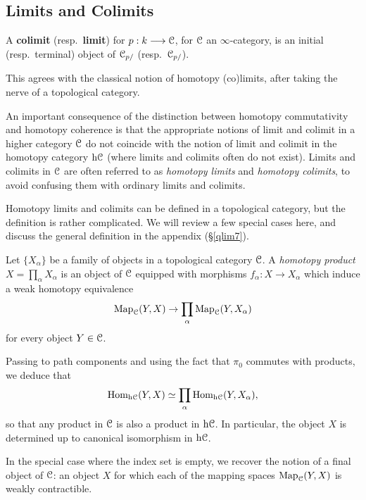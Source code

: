 \subsection{Limits and Colimits}\label{limitcolimit}
\begin{1.2.13 Limits and colimits}
\begin{shaded}
A \textbf{colimit} (resp.\ \textbf{limit})  for $p:k\longrightarrow\mathcal{C}$, for $\mathcal{C}$ an $\infty$-category, is an initial (resp.\ terminal)  object of $\operatorname{\mathcal{C}}_{p/}$ (resp.\ $\operatorname{\mathcal{C}}_{p/}$).

This agrees with the classical notion of homotopy (co)limits, after taking the nerve of a topological category.
\end{shaded}
An important consequence of the distinction between homotopy
commutativity and homotopy coherence is that the appropriate
notions of limit and colimit in a higher category
$\operatorname{\mathcal{C}}$ do not coincide with the notion of limit and colimit in the homotopy category $\rm{h} \it{\operatorname{\mathcal{C}}}$ (where limits and colimits often do
not exist). Limits and colimits in
$\operatorname{\mathcal{C}}$ are often referred to as {\it homotopy limits} and
{\it homotopy colimits}, to avoid confusing them with ordinary limits
and colimits.

Homotopy limits and
colimits can be defined in a topological category, but the
definition is rather complicated. We will review a few special cases here, and discuss the general definition in the appendix (\S \ref{qlim7}).

\begin{example}\label{examprod}
Let $\{ X_{\alpha} \}$ be a family of objects in a topological
category $\operatorname{\mathcal{C}}$. A {\it homotopy product} $X = \prod_{\alpha}
X_{\alpha}$ is an object of $\operatorname{\mathcal{C}}$ equipped with morphisms
$f_{\alpha}: X \rightarrow X_{\alpha}$ which induce a weak
homotopy equivalence
$$ \operatorname{{Map}}_{\operatorname{\mathcal{C}}}(Y,X) \rightarrow \prod_{\alpha} \operatorname{{Map}}_{\operatorname{\mathcal{C}}}(Y,
X_{\alpha})$$ for every object $Y \in \operatorname{\mathcal{C}}$.

Passing to path components and using the fact that $\pi_0$
commutes with products, we deduce that $$\operatorname{Hom}_{\rm{h} \it{\operatorname{\mathcal{C}}}}(Y,X) \simeq
\prod_{\alpha} \operatorname{Hom}_{\rm{h} \it{\operatorname{\mathcal{C}}}}(Y, X_{\alpha}),$$ so that any product in $\operatorname{\mathcal{C}}$ is
also a product in $\rm{h} \it{\operatorname{\mathcal{C}}}$. In particular, the object $X$ is
determined up to canonical isomorphism in $\rm{h} \it{\operatorname{\mathcal{C}}}$.

In the special case where the index set is empty, we recover the
notion of a final object of $\operatorname{\mathcal{C}}$: an object $X$ for which each
of the mapping spaces $\operatorname{{Map}}_{\operatorname{\mathcal{C}}}(Y,X)$ is weakly contractible.
\end{example}


\end{1.2.13 Limits and colimits}
